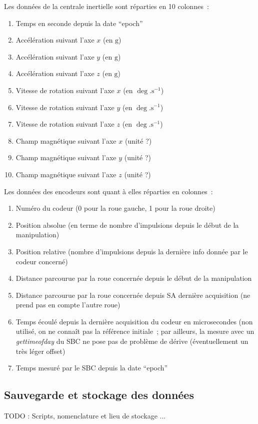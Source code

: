 \documentclass[a4paper, 10pt ]{article}
\begin{document}
\noindent Les données de la centrale inertielle sont réparties en 10 colonnes~:
\begin{enumerate}
	\item Temps en seconde depuis la date ``epoch''
	\item Accélération suivant l'axe $x$ (en $\mathrm{g}$)
	\item Accélération suivant l'axe $y$ (en $\mathrm{g}$)
	\item Accélération suivant l'axe $z$ (en $\mathrm{g}$)
	\item Vitesse de rotation suivant l'axe $x$ (en $\deg.\mathrm{s}^{-1}$)
	\item Vitesse de rotation suivant l'axe $y$ (en $\deg.\mathrm{s}^{-1}$)
	\item Vitesse de rotation suivant l'axe $z$ (en $\deg.\mathrm{s}^{-1}$)
	\item Champ magnétique suivant l'axe $x$ (unité ?)
	\item Champ magnétique suivant l'axe $y$ (unité ?)
	\item Champ magnétique suivant l'axe $z$ (unité ?)
\end{enumerate}

\noindent Les données des encodeurs sont quant à elles réparties en colonnes~:
\begin{enumerate}
	\item Numéro du codeur (0 pour la roue gauche, 1 pour la roue droite)
	\item Position absolue (en terme de nombre d'impulsions depuis le début de la manipulation)
	\item Position relative (nombre d'impulsions depuis la dernière info donnée par le codeur concerné)
	\item Distance parcourue par la roue concernée depuis le début de la manipulation
	\item Distance parcourue par la roue concernée depuis SA dernière acquisition (ne prend pas en compte l'autre roue)
	\item Temps écoulé depuis la dernière acquisition du codeur en microsecondes (non utilisé, on ne connaît pas la référence initiale~; par ailleurs, la mesure avec un \emph{gettimeofday} du SBC ne pose pas de problème de dérive (éventuellement un très léger offset)
	\item Temps mesuré par le SBC depuis la date ``epoch''
\end{enumerate}

\subsection{Sauvegarde et stockage des données}

TODO : Scripts, nomenclature et lieu de stockage ...


 

\end{document}
